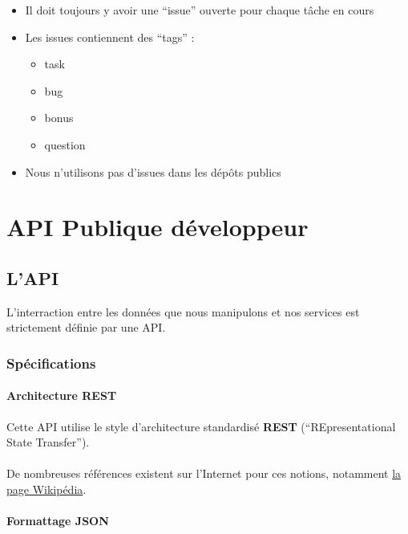 \documentclass{life-fr}
\begin{document}
\begin{itemize}
  \item Il doit toujours y avoir une ``issue'' ouverte pour chaque tâche en cours
  \item Les issues contiennent des ``tags'' :
    \begin{itemize}
      \item task
      \item bug
      \item bonus
      \item question
    \end{itemize}
    \item Nous n'utilisons pas d'issues dans les dépôts publics
\end{itemize}



\chapter{API Publique développeur}

\section{L'API}

L'interraction entre les données que nous manipulons et nos services est
strictement définie par une API.

\subsection{Spécifications}

\subsubsection{Architecture REST}

Cette API utilise le style d'architecture standardisé \textbf{REST}
(``REpresentational State Transfer'').\\
\\
De nombreuses références existent sur l'Internet pour ces notions, notamment
\href{http://fr.wikipedia.org/wiki/Representational_State_Transfer}{la page Wikipédia}.

\subsubsection{Formattage JSON}
\end{document}
